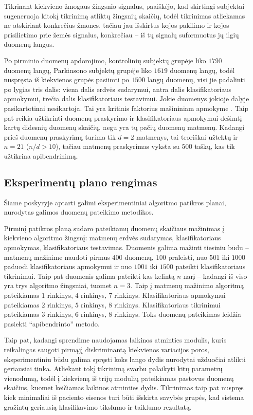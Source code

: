 \documentclass[]{vgtuef}
\begin{document}
Tikrinant kiekvieno žmogaus žingsnio signalus, paaiškėjo, kad skirtingi subjektai sugeneruoja kitokį tikrinimą atliktų žingsnių skaičių, todėl tikrinimas atliekamas ne atskiriant konkrečius žmones, tačiau jau išskirtus kojos pakilimo ir kojos prisilietimo prie žemės signalus, konkrečiau -- iš tų signalų suformuotus jų ilgių duomenų langus.

Po pirminio duomenų apdorojimo, kontrolinių subjektų grupėje liko $1790$ duomenų langų, Parkinsono subjektų grupėje liko $1619$ duomenų langų, todėl nuspręsta iš kiekvienos grupės pasiimti po $1500$ langų duomenų, visi jie padalinti po lygias tris dalis: viena dalis erdvės sudarymui, antra dalis klasifikatoriaus apmokymui, trečia dalis klasifikatoriaus testavimui. Jokie duomenys jokioje dalyje pasikartotinai nesikartoja. Tai yra kritinis faktorius mašininiam apmokyme \cite{824819}. Taip pat reikia užtikrinti duomenų praskyrimo ir klasifikatoriaus apmokymui dešimtį kartų didesnių duomenų skaičių, negu yra tų pačių duomenų matmenų. Kadangi prieš duomenų praskyrimą turima tik $d=2$ matmenys, tai teoriškai užtektų ir $n=21$ ($n/d > 10$), tačiau matmenų praskyrimas vyksta su $500$ taškų, kas tik užtikrina apibendrinimą. 

\subsection{Eksperimentų plano rengimas}

Šiame poskyryje aptarti galimi eksperimentiniai algoritmo patikros planai, nurodytas galimos duomenų pateikimo metodikos.

Pirminį patikros planą sudaro pateikiamų duomenų skaičiaus mažinimas į kiekvieno algoritmo žingsnį: matmenų erdvės sudarymas, klasifikatoriaus apmokymas, klasifikatoriaus testavimas. Duomenis galima mažinti tiesiniu būdu -- matmenų mažinime naudoti pirmus $400$ duomenų, $100$ praleisti, nuo $501$ iki $1000$ paduodi klasifikatoriaus apmokymui ir nuo $1001$ iki $1500$ pateikti klasifikatoriaus tikrinimui. Taip pat duomenis galima pateikti kas kelintą $n$ narį -- kadangi iš viso yra trys algoritmo žingsniai, tuomet $n=3$. Taip į matmenų mažinimo algoritmą pateikiamas $1$ rinkinys, $4$ rinkinys, $7$ rinkinys. Klasifikatoriaus apmokymui pateikiamas $2$ rinkinys, $5$ rinkinys, $8$ rinkinys. Klasifikatoriaus tikrinimui pateikiamas $3$ rinkinys, $6$ rinkinys, $8$ rinkinys. Toks duomenų pateikimas leidžia pasiekti ``apibendrinto'' metodo. 

Taip pat, kadangi sprendime naudojamas laikinos atminties modulis, kuris reikalingas saugoti pirmąjį diskriminantą kiekvienos variacijos poros, eksperimentiniu būdu galima spręsti koks lango dydis nurodytai užduočiai atlikti geriausiai tinka. Atliekant tokį tikrinimą svarbu palaikyti kitų parametrų vienodumą, todėl į kiekvieną iš trijų modulių pateikiamas pastovus duomenų skaičius, kuomet keičiamas laikinos atminties dydis. Tikrinimas taip pat nuspręs kiek minimaliai iš paciento eisenos turi būti išskirta savybės grupės, kad sistema gražintų geriausią klasifikavimo tikslumo ir taiklumo rezultatą.
\end{document}
